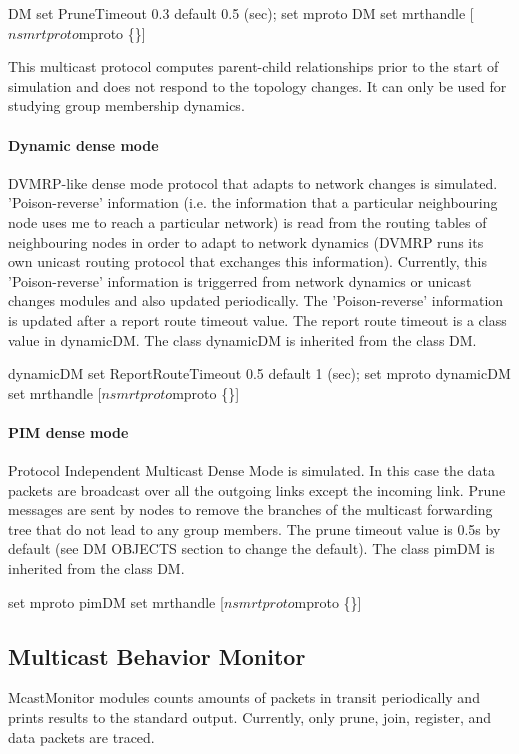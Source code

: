\begin{program}
	DM set PruneTimeout 0.3           \; default 0.5 (sec);
	set mproto DM
	set mrthandle [$ns mrtproto $mproto \{\}]
\end{program}

This multicast protocol computes parent-child relationships prior to
the start of simulation and does not respond to the topology
changes. It can only be used for studying group membership dynamics.

\paragraph{Dynamic dense mode}
DVMRP-like dense mode protocol that adapts to network changes is
simulated.  'Poison-reverse' information (i.e. the information that a
particular neighbouring node uses me to reach a particular network) is
read from the routing tables of neighbouring nodes in order to adapt
to network dynamics (DVMRP runs its own unicast routing protocol that
exchanges this information).  Currently, this 'Poison-reverse'
information is triggerred from network dynamics or unicast changes
modules and also updated periodically.  The 'Poison-reverse'
information is updated after a report route timeout value. The report
route timeout is a class value in dynamicDM.  The class dynamicDM is
inherited from the class DM.

\begin{program}
	dynamicDM set ReportRouteTimeout 0.5  \; default 1 (sec);
	set mproto dynamicDM
	set mrthandle [$ns mrtproto $mproto \{\}]
\end{program}

\paragraph{PIM dense mode}
Protocol Independent Multicast Dense Mode is simulated.  In this case
the data packets are broadcast over all the outgoing links except the
incoming link. Prune messages are sent by nodes to remove the branches
of the multicast forwarding tree that do not lead to any group
members. The prune timeout value is 0.5s by default (see DM OBJECTS
section to change the default). The class pimDM is inherited from the
class DM.

\begin{program}
	set mproto pimDM
	set mrthandle [$ns mrtproto $mproto \{\}]
\end{program}

\subsection{Multicast Behavior Monitor}
McastMonitor modules counts amounts of packets in transit periodically
and prints results to the standard output.  Currently, only prune,
join, register, and data packets are traced.

